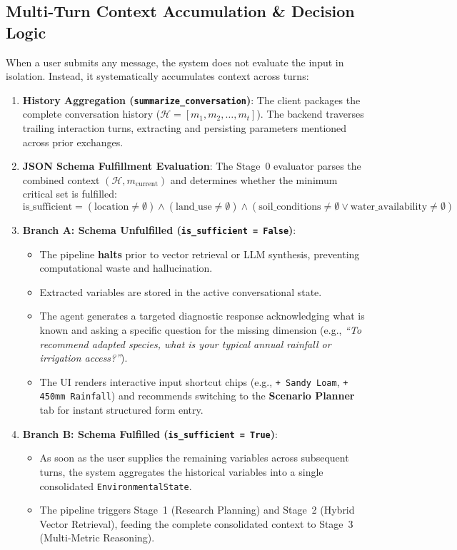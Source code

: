 \documentclass[11pt,a4paper]{article}
\begin{document}
\subsection{Multi-Turn Context Accumulation \& Decision Logic}
When a user submits any message, the system does not evaluate the input in isolation. Instead, it systematically accumulates context across turns:
\begin{enumerate}[leftmargin=1.5em, itemsep=3pt]
    \item \textbf{History Aggregation (\texttt{summarize\_conversation})}: The client packages the complete conversation history ($\mathcal{H} = [m_1, m_2, \dots, m_t]$). The backend traverses trailing interaction turns, extracting and persisting parameters mentioned across prior exchanges.
    \item \textbf{JSON Schema Fulfillment Evaluation}: The Stage~0 evaluator parses the combined context $(\mathcal{H}, m_{\text{current}})$ and determines whether the minimum critical set is fulfilled:
    \begin{equation}
        \text{is\_sufficient} = (\text{location} \neq \emptyset) \land (\text{land\_use} \neq \emptyset) \land (\text{soil\_conditions} \neq \emptyset \lor \text{water\_availability} \neq \emptyset)
    \end{equation}
    \item \textbf{Branch A: Schema Unfulfilled (\texttt{is\_sufficient = False})}:
    \begin{itemize}[itemsep=1pt]
        \item The pipeline \textbf{halts} prior to vector retrieval or LLM synthesis, preventing computational waste and hallucination.
        \item Extracted variables are stored in the active conversational state.
        \item The agent generates a targeted diagnostic response acknowledging what is known and asking a specific question for the missing dimension (e.g., \textit{``To recommend adapted species, what is your typical annual rainfall or irrigation access?''}).
        \item The UI renders interactive input shortcut chips (e.g., \texttt{+ Sandy Loam}, \texttt{+ 450mm Rainfall}) and recommends switching to the \textbf{Scenario Planner} tab for instant structured form entry.
    \end{itemize}
    \item \textbf{Branch B: Schema Fulfilled (\texttt{is\_sufficient = True})}:
    \begin{itemize}[itemsep=1pt]
        \item As soon as the user supplies the remaining variables across subsequent turns, the system aggregates the historical variables into a single consolidated \texttt{EnvironmentalState}.
        \item The pipeline triggers Stage~1 (Research Planning) and Stage~2 (Hybrid Vector Retrieval), feeding the complete consolidated context to Stage~3 (Multi-Metric Reasoning).
    \end{itemize}
\end{enumerate}
\end{document}
